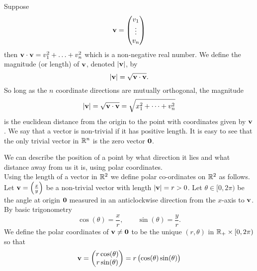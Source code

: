 \documentclass[10pt, a4paper]{article}
\begin{document}
\begin{definition}[Magnitude]
    Suppose
    \[
    \mathbf{v} = \begin{pmatrix}
        v_1 \\
        \vdots \\
        v_n
    \end{pmatrix}
    \]
    then $\mathbf{v \cdot v} = v_1 ^ 2 + \dotsc + v_n ^ 2$ which is a non-negative real number. We define the magnitude (or length) of $\mathbf{v}$, denoted $|\mathbf{v}|$, by
    \[
    |\mathbf{v}| = \sqrt{\mathbf{v \cdot v}}.
    \]
    So long as the $n$ coordinate directions are mutually orthogonal, the magnitude
    \[
    |\mathbf{v}| = \sqrt{\mathbf{v \cdot v}} = \sqrt{x_1 ^ 2 + \cdots + v_n ^ 2}
    \]
    is the euclidean distance from the origin to the point with coordinates given by $\mathbf{v}$. We say that a vector is non-trivial if it has positive length. It is easy to see that the only trivial vector in $\mathbb{R} ^ n$ is the zero vector $\mathbf{0}$.
\end{definition}


We can describe the position of a point by what direction it lies and what distance away from us it is, using polar coordinates. \\


Using the length of a vector in $\mathbb{R} ^ 2$ we define polar co-ordinates on $\mathbb{R} ^ 2$ as follows. Let $\mathbf{v} = \left(\frac{x}{y}\right)$ be a non-trivial vector with length $|\mathbf{v}| = r > 0$. Let $\theta \in [0, 2\pi)$ be the angle at origin $\mathbf{0}$ measured in an anticlockwise direction from the $x$-axis to $\mathbf{v}$. By basic trigonometry
\[
\cos(\theta) = \frac{x}{r},\qquad\sin(\theta) = \frac{y}{r}.
\]
We define the polar coordinates of $\mathbf{v \neq 0}$ to be the unique $(r, \theta)$ in $\mathbb{R}_+ \times [0, 2\pi)$ so that
\[
\mathbf{v} = \begin{pmatrix}
    r\cos(\theta) \\
    r\sin(\theta)
\end{pmatrix}
=
r\begin{pmatrix}
    \cos(\theta)
    \sin(\theta)
\end{pmatrix}
\]
\end{document}
